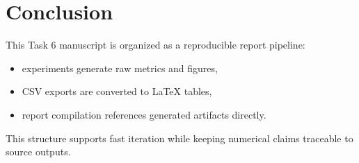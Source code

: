 \chapter{Conclusion}

This Task 6 manuscript is organized as a reproducible report pipeline:
\begin{itemize}[leftmargin=1.5em]
\item experiments generate raw metrics and figures,
\item CSV exports are converted to \LaTeX{} tables,
\item report compilation references generated artifacts directly.
\end{itemize}

This structure supports fast iteration while keeping numerical claims traceable to source outputs.
